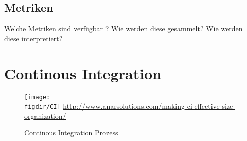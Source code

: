 \subsection{Metriken}

Welche Metriken sind verfügbar ?
Wie werden diese gesammelt?
Wie werden diese interpretiert?




\section{Continous Integration}

\begin{figure}
	{\caption{Continous Integration Prozess}
		\label{fig:continousIntegration}}
	{\texttt{[image: \\figdir/CI]}}
	\tiny{\quelle\url{http://www.anarsolutions.com/making-ci-effective-size-organization/}}
\end{figure}

